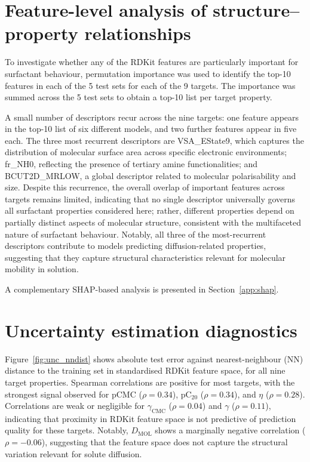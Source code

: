 \documentclass[11pt]{aime}
\begin{document}
\section{Feature-level analysis of structure--property relationships}
\label{app:feature_importance}

To investigate whether any of the RDKit features are particularly important for surfactant behaviour, permutation importance was used to identify the top-10 features in each of the 5 test sets for each of the 9 targets.
The importance was summed across the 5 test sets to obtain a top-10 list per target property.

A small number of descriptors recur across the nine targets: one feature appears in the top-10 list of six different models, and two further features appear in five each.
The three most recurrent descriptors are VSA\_EState9, which captures the distribution of molecular surface area across specific electronic environments;
fr\_NH0, reflecting the presence of tertiary amine functionalities;
and BCUT2D\_MRLOW, a global descriptor related to molecular polarisability and size.
Despite this recurrence, the overall overlap of important features across targets remains limited, indicating that no single descriptor universally governs all surfactant properties considered here;
rather, different properties depend on partially distinct aspects of molecular structure, consistent with the multifaceted nature of surfactant behaviour.
Notably, all three of the most-recurrent descriptors contribute to models predicting diffusion-related properties, suggesting that they capture structural characteristics relevant for molecular mobility in solution.

A complementary SHAP-based analysis is presented in Section~\ref{app:shap}.



\section{Uncertainty estimation diagnostics}
\label{app:unc_diagnostics}

Figure~\ref{fig:unc_nndist} shows absolute test error against nearest-neighbour (NN) distance to the training set in standardised RDKit feature space, for all nine target properties.
Spearman correlations are positive for most targets, with the strongest signal observed for pCMC ($\rho = 0.34$), pC$_{20}$ ($\rho = 0.34$), and $\eta$ ($\rho = 0.28$).
Correlations are weak or negligible for $\gamma_{\mathrm{CMC}}$ ($\rho = 0.04$) and $\gamma$ ($\rho = 0.11$), indicating that proximity in RDKit feature space is not predictive of prediction quality for these targets.
Notably, $D_{\mathrm{MOL}}$ shows a marginally negative correlation ($\rho = -0.06$), suggesting that the feature space does not capture the structural variation relevant for solute diffusion.
\end{document}
